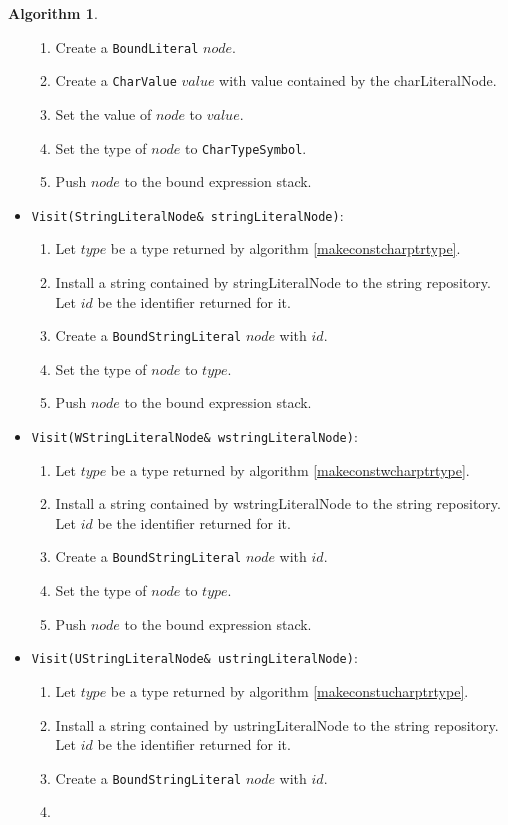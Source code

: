 \documentclass[a4paper,oneside,11pt]{book}
\theoremstyle{definition}
\newtheorem{algo}{Algorithm}[section]
\begin{document}
\begin{algo}
\begin{itemize}
\begin{enumerate}
\item
Create a \verb|BoundLiteral| $node$.
\item
Create a \verb|CharValue| $value$ with value contained by the charLiteralNode.
\item
Set the value of $node$ to $value$.
\item
Set the type of $node$ to \verb|CharTypeSymbol|.
\item
Push $node$ to the bound expression stack.
\end{enumerate}
\item
\verb|Visit(StringLiteralNode& stringLiteralNode)|:
\begin{enumerate}
\item
Let $type$ be a type returned by algorithm \ref{makeconstcharptrtype}.
\item
Install a string contained by stringLiteralNode to the string repository. Let $id$ be the identifier returned for it.
\item
Create a \verb|BoundStringLiteral| $node$ with $id$.
\item
Set the type of $node$ to $type$.
\item
Push $node$ to the bound expression stack.
\end{enumerate}
\item
\verb|Visit(WStringLiteralNode& wstringLiteralNode)|:
\begin{enumerate}
\item
Let $type$ be a type returned by algorithm \ref{makeconstwcharptrtype}.
\item
Install a string contained by wstringLiteralNode to the string repository. Let $id$ be the identifier returned for it.
\item
Create a \verb|BoundStringLiteral| $node$ with $id$.
\item
Set the type of $node$ to $type$.
\item
Push $node$ to the bound expression stack.
\end{enumerate}
\item
\verb|Visit(UStringLiteralNode& ustringLiteralNode)|:
\begin{enumerate}
\item
Let $type$ be a type returned by algorithm \ref{makeconstucharptrtype}.
\item
Install a string contained by ustringLiteralNode to the string repository. Let $id$ be the identifier returned for it.
\item
Create a \verb|BoundStringLiteral| $node$ with $id$.
\item

\end{enumerate}
\end{itemize}
\end{algo}
\end{document}
